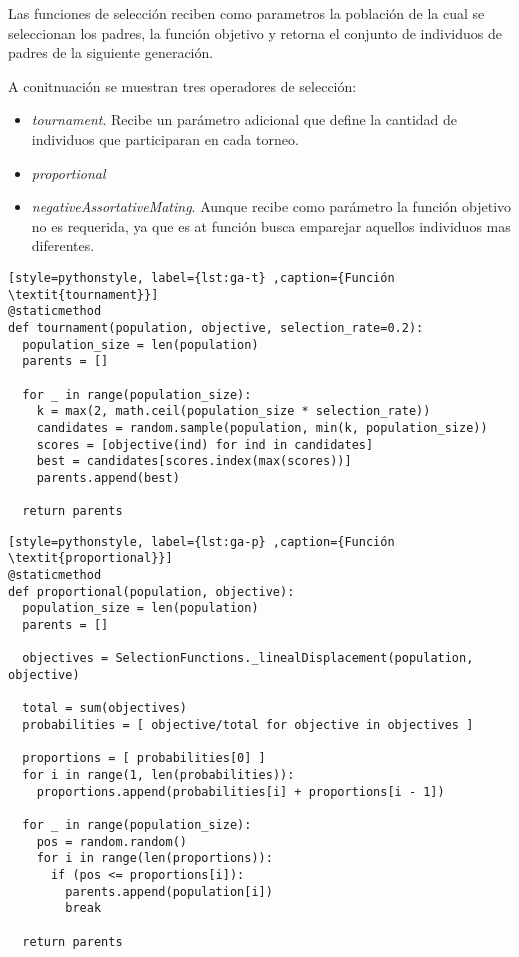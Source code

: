 Las funciones de selección reciben como parametros la población de la cual se seleccionan los padres, la función objetivo y retorna el conjunto de individuos de padres de la siguiente generación.

 A conitnuación se muestran tres operadores de selección: 
 \begin{itemize}
 	\item \textit{tournament}. Recibe un parámetro adicional que define la cantidad de individuos que participaran en cada torneo.
 	\item \textit{proportional}
 	\item \textit{negativeAssortativeMating}. Aunque recibe como parámetro la función objetivo no es requerida, ya que es at función busca emparejar aquellos individuos mas diferentes.
 \end{itemize}
 
\begin{lstlisting}[style=pythonstyle, label={lst:ga-t} ,caption={Función  \textit{tournament}}]
@staticmethod
def tournament(population, objective, selection_rate=0.2):
  population_size = len(population)
  parents = []

  for _ in range(population_size):
    k = max(2, math.ceil(population_size * selection_rate))
    candidates = random.sample(population, min(k, population_size))
    scores = [objective(ind) for ind in candidates]
    best = candidates[scores.index(max(scores))]
    parents.append(best)

  return parents    
\end{lstlisting}

\begin{lstlisting}[style=pythonstyle, label={lst:ga-p} ,caption={Función  \textit{proportional}}]
@staticmethod
def proportional(population, objective):
  population_size = len(population)
  parents = []

  objectives = SelectionFunctions._linealDisplacement(population, objective)

  total = sum(objectives)
  probabilities = [ objective/total for objective in objectives ]

  proportions = [ probabilities[0] ]
  for i in range(1, len(probabilities)):
    proportions.append(probabilities[i] + proportions[i - 1])

  for _ in range(population_size):
    pos = random.random()
    for i in range(len(proportions)):
      if (pos <= proportions[i]):
        parents.append(population[i])
        break

  return parents
\end{lstlisting}

